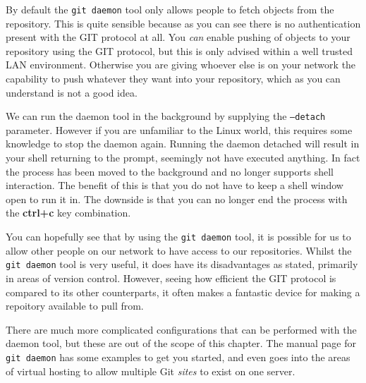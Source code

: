 By default the \texttt{git daemon} tool only allows people to fetch objects from the repository.
This is quite sensible because as you can see there is no authentication present with the GIT protocol at all.
You \emph{can} enable pushing of objects to your repository using the GIT protocol, but this is only advised within a well trusted LAN environment.
Otherwise you are giving whoever else is on your network the capability to push whatever they want into your repository, which as you can understand is not a good idea.

We can run the daemon tool in the background by supplying the \texttt{--detach} parameter.
However if you are unfamiliar to the Linux world, this requires some knowledge to stop the daemon again.
Running the daemon detached will result in your shell returning to the prompt, seemingly not have executed anything.
In fact the process has been moved to the background and no longer supports shell interaction.
The benefit of this is that you do not have to keep a shell window open to run it in.
The downside is that you can no longer end the process with the \textbf{ctrl+c} key combination.

You can hopefully see that by using the \texttt{git daemon} tool, it is possible for us to allow other people on our network to have access to our repositories.
Whilst the \texttt{git daemon} tool is very useful, it does have its disadvantages as stated, primarily in areas of version control.
However, seeing how efficient the GIT protocol is compared to its other counterparts, it often makes a fantastic device for making a repoitory available to pull from.

There are much more complicated configurations that can be performed with the daemon tool, but these are out of the scope of this chapter.
The manual page for \texttt{git daemon} has some examples to get you started,
and even goes into the areas of virtual hosting to allow multiple Git \emph{sites} to exist on one server.
